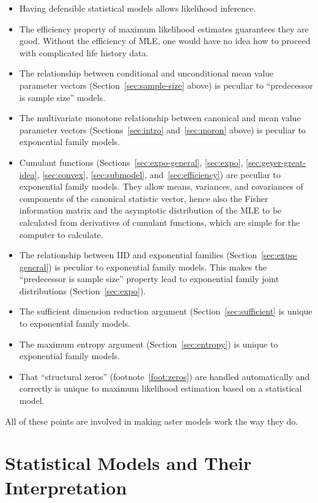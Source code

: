\documentclass[11pt]{article}
\begin{document}
\begin{itemize}
\item Having defensible statistical models allows likelihood inference.
\item The efficiency property of maximum likelihood estimates guarantees
    they are good.  Without the efficiency of MLE, one would have no idea
    how to proceed with complicated life history data.
\item The relationship between conditional and unconditional mean value
    parameter vectors (Section~\ref{sec:sample-size} above) is peculiar
    to ``predecessor is sample size'' models.
\item The multivariate monotone relationship between canonical and mean value
    parameter vectors (Sections~\ref{sec:intro} and~\ref{sec:moron} above)
    is peculiar to exponential family models.
\item Cumulant functions (Sections~\ref{sec:expo-general}, \ref{sec:expo},
    \ref{sec:geyer-great-idea}, \ref{sec:convex}, \ref{sec:submodel},
    and~\ref{sec:efficiency}) are peculiar to exponential family models.
    They allow means, variances, and covariances of components of the
    canonical statistic vector, hence also the Fisher information matrix
    and the asymptotic distribution of the MLE to be calculated from
    derivatives of cumulant functions, which are simple for the computer
    to calculate.
\item The relationship between IID and exponential families
    (Section~\ref{sec:expo-general}) is peculiar to exponential family models.
    This makes the ``predecessor is sample size'' property lead to exponential
    family joint distributions (Section~\ref{sec:expo}).
\item The sufficient dimension reduction argument (Section~\ref{sec:sufficient}
    is unique to exponential family models.
\item The maximum entropy argument (Section~\ref{sec:entropy})
    is unique to exponential family models.
\item That ``structural zeros'' (footnote~\ref{foot:zeros}) are handled
    automatically and correctly is unique to maximum likelihood estimation
    based on a statistical model.
\end{itemize}
All of these points are involved in making aster models work the way they do.

\section{Statistical Models and Their Interpretation}
\end{document}
